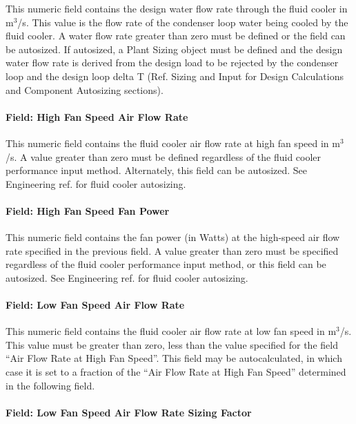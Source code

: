 This numeric field contains the design water flow rate through the fluid cooler in m\(^{3}\)/s. This value is the flow rate of the condenser loop water being cooled by the fluid cooler. A water flow rate greater than zero must be defined or the field can be autosized. If autosized, a Plant Sizing object must be defined and the design water flow rate is derived from the design load to be rejected by the condenser loop and the design loop delta T (Ref. Sizing and Input for Design Calculations and Component Autosizing sections).

\paragraph{Field: High Fan Speed Air Flow Rate}\label{field-high-fan-speed-air-flow-rate-2}

This numeric field contains the fluid cooler air flow rate at high fan speed in m\(^{3}\)/s. A value greater than zero must be defined regardless of the fluid cooler performance input method. Alternately, this field can be autosized. See Engineering ref. for fluid cooler autosizing.

\paragraph{Field: High Fan Speed Fan Power}\label{field-high-fan-speed-fan-power-1}

This numeric field contains the fan power (in Watts) at the high-speed air flow rate specified in the previous field. A value greater than zero must be specified regardless of the fluid cooler performance input method, or this field can be autosized. See Engineering ref. for fluid cooler autosizing.

\paragraph{Field: Low Fan Speed Air Flow Rate}\label{field-low-fan-speed-air-flow-rate-2}

This numeric field contains the fluid cooler air flow rate at low fan speed in m\(^{3}\)/s. This value must be greater than zero, less than the value specified for the field ``Air Flow Rate at High Fan Speed''. This field may be autocalculated, in which case it is set to a fraction of the ``Air Flow Rate at High Fan Speed'' determined in the following field.

\paragraph{Field: Low Fan Speed Air Flow Rate Sizing Factor}\label{field-low-fan-speed-air-flow-rate-sizing-factor-2}

